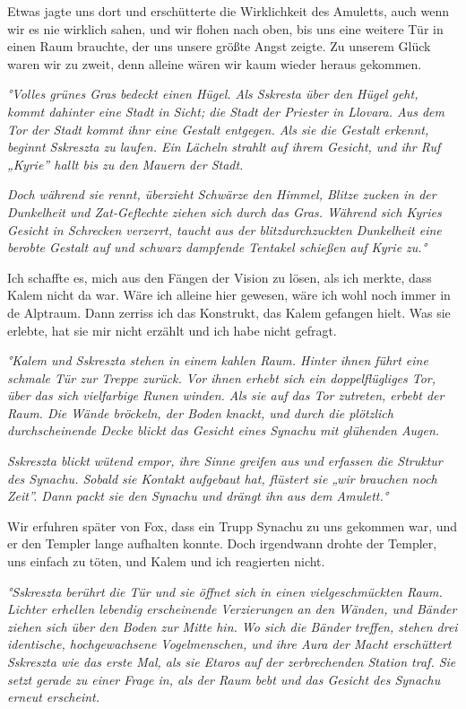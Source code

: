 \documentclass[11pt]{article}
\begin{document}
Etwas jagte uns dort und erschütterte die Wirklichkeit des Amuletts,
auch wenn wir es nie wirklich sahen, und wir flohen nach oben, bis uns
eine weitere Tür in einen Raum brauchte, der uns unsere größte Angst
zeigte. Zu unserem Glück waren wir zu zweit, denn alleine wären wir kaum
wieder heraus gekommen.

\emph{°Volles grünes Gras bedeckt einen Hügel. Als Sskresta über den
Hügel geht, kommt dahinter eine Stadt in Sicht; die Stadt der Priester
in Llovara. Aus dem Tor der Stadt kommt ihnr eine Gestalt entgegen. Als
sie die Gestalt erkennt, beginnt Sskreszta zu laufen. Ein Lächeln
strahlt auf ihrem Gesicht, und ihr Ruf „Kyrie'' hallt bis zu den Mauern
der Stadt.}

\emph{Doch während sie rennt, überzieht Schwärze den Himmel, Blitze
zucken in der Dunkelheit und Zat-Geflechte ziehen sich durch das Gras.
Während sich Kyries Gesicht in Schrecken verzerrt, taucht aus der
blitzdurchzuckten Dunkelheit eine berobte Gestalt auf und schwarz
dampfende Tentakel schießen auf Kyrie zu.°}

Ich schaffte es, mich aus den Fängen der Vision zu lösen, als ich
merkte, dass Kalem nicht da war. Wäre ich alleine hier gewesen, wäre ich
wohl noch immer in de Alptraum. Dann zerriss ich das Konstrukt, das
Kalem gefangen hielt. Was sie erlebte, hat sie mir nicht erzählt und ich
habe nicht gefragt.

\emph{°Kalem und Sskreszta stehen in einem kahlen Raum. Hinter ihnen
führt eine schmale Tür zur Treppe zurück. Vor ihnen erhebt sich ein
doppelflügliges Tor, über das sich vielfarbige Runen winden. Als sie auf
das Tor zutreten, erbebt der Raum. Die Wände bröckeln, der Boden knackt,
und durch die plötzlich durchscheinende Decke blickt das Gesicht eines
Synachu mit glühenden Augen.}

\emph{Sskreszta blickt wütend empor, ihre Sinne greifen aus und erfassen
die Struktur des Synachu. Sobald sie Kontakt aufgebaut hat, flüstert sie
„wir brauchen noch Zeit''. Dann packt sie den Synachu und drängt ihn aus
dem Amulett.°}

Wir erfuhren später von Fox, dass ein Trupp Synachu zu uns gekommen war,
und er den Templer lange aufhalten konnte. Doch irgendwann drohte der
Templer, uns einfach zu töten, und Kalem und ich reagierten nicht.

\emph{°Sskreszta berührt die Tür und sie öffnet sich in einen
vielgeschmückten Raum. Lichter erhellen lebendig erscheinende
Verzierungen an den Wänden, und Bänder ziehen sich über den Boden zur
Mitte hin. Wo sich die Bänder treffen, stehen drei identische,
hochgewachsene Vogelmenschen, und ihre Aura der Macht erschüttert
Sskreszta wie das erste Mal, als sie Etaros auf der zerbrechenden
Station traf. Sie setzt gerade zu einer Frage in, als der Raum bebt und
das Gesicht des Synachu erneut erscheint.}
\end{document}
